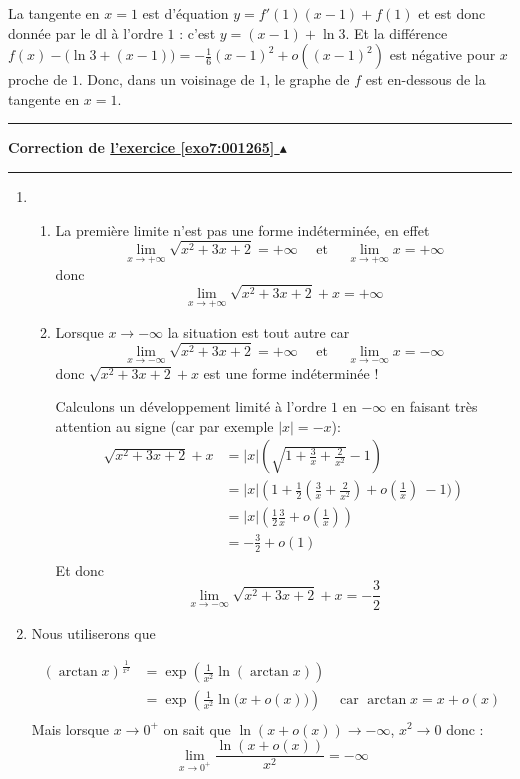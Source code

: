 \documentclass[11pt,a4paper]{article}
\newcommand{\Arctan}{\mathop{\mathrm{arctan}}\nolimits}
\newcounter{exo}
\newcommand{\correction}[1]{\hypertarget{cor7:#1}{}\label{cor7:#1}{\bf Correction de \hyperlink{exo7:#1}{l'exercice \ref{exo7:#1} $\blacktriangle$}}\vspace{1mm}\hrule\vspace{1mm}}
\newcommand{\fincorrection}{\vspace{1mm}\hrule\vspace*{7mm}}
\begin{document}
La tangente en $x=1$ est d'équation $y=f'(1)(x-1)+f(1)$ et est donc donnée par le dl à l'ordre $1$ : c'est  $y = (x-1) + \ln 3$.
Et la différence 
$f(x)-\big(\ln 3 + (x-1)\big) = - \frac16 (x-1)^2 + o((x-1)^2)$ est négative pour $x$ proche de $1$.
Donc, dans un voisinage de $1$, le graphe de $f$ est en-dessous de la tangente en $x=1$.
\fincorrection
\correction{001265}
\begin{enumerate}
  \item 
  \begin{enumerate}
    \item La première limite n'est pas une forme indéterminée, en effet 
$$\lim_{x \rightarrow +\infty} \sqrt {x^2+3x+2}  = +\infty \quad \text{ et } \quad \lim_{x \rightarrow +\infty} x = +\infty$$
donc 
$$\lim_{x \rightarrow +\infty} \sqrt {x^2+3x+2} +x = + \infty$$
    \item Lorsque $x\to -\infty$ la situation est tout autre car
$$\lim_{x \rightarrow -\infty} \sqrt {x^2+3x+2} = +\infty \quad \text{ et } \quad \lim_{x \rightarrow -\infty} x = -\infty$$
donc $\sqrt {x^2+3x+2} +x$ est une forme indéterminée !

Calculons un développement limité à l'ordre $1$ en $-\infty$ en faisant très attention au signe (car par exemple $|x|=-x$):
\begin{align*}
\sqrt{x^2+3x+2} +x 
  & = |x| \left( \sqrt{1+\frac{3}{x}+\frac{2}{x^2}} -1 \right) \\
  & = |x| \left( 1+\frac12\left(\frac{3}{x}+\frac{2}{x^2}\right)+o(\frac1x) \ -1)  \right) \\
  & = |x| \left( \frac12\frac{3}{x}+o(\frac1x) \right) \\
  & = -\frac32 + o(1) \\
\end{align*}
Et donc  
$$\lim_{x \rightarrow -\infty} \sqrt {x^2+3x+2} +x = -\frac32$$

  \end{enumerate}
  \item 
Nous utiliserons que 

\begin{align*}
(\Arctan x)^{\frac{1}{x^2}}
  & = \exp\left(\frac{1}{x^2} \ln \left( \Arctan x \right) \right) \\
  & = \exp\left(\frac{1}{x^2} \ln \big( x + o(x)\big) \right) \quad \text{ car } \Arctan x = x + o(x) \\
\end{align*}
Mais lorsque $x\to 0^+$ on sait que $\ln (x+o(x)) \to -\infty$, $x^2 \to 0$ 
donc :
$$\lim_{x\to0^+} \frac{\ln (x+o(x))}{x^2} = -\infty$$


\end{enumerate}
\end{document}
